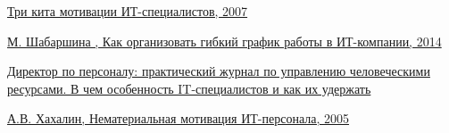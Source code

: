 \documentclass{../industrial-development}
\begin{document}
\begin{thebibliography}{99}
		 \href{https://www.osp.ru/cio/2007/08/4326047/}{Три кита мотивации ИТ-специалистов, 2007}
		
		 \href{http://saas.ru/cases/~kak-orghanizovat-ghibkii-ghrafik-raboty-v-it-kompanii}{М. Шабаршина , Как организовать гибкий график работы в ИТ-компании, 2014}
		
		 \href{https://www.hr-director.ru/article/63599-qqe-15-m4-v-kompanii-ploho-prijivayutsya-it-spetsialisty}{Директор по персоналу: практический журнал по управлению человеческими ресурсами. В чем особенность IT-специалистов и как их удержать}
		
		 \href{https://www.ippnou.ru/print/001184/}{А.В. Хахалин, Нематериальная мотивация ИТ-персонала, 2005}
		
	\end{thebibliography}
	
\end{document}
